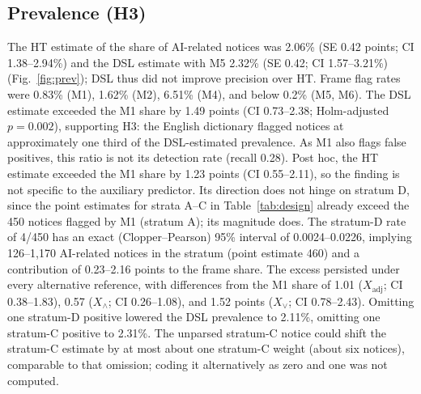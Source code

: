 \documentclass[runningheads]{llncs}
\begin{document}
\subsection{Prevalence (H3)}
The HT estimate of the share of AI-related notices was 2.06\% (SE 0.42 points; CI 1.38--2.94\%) and the DSL estimate with M5 2.32\% (SE 0.42; CI 1.57--3.21\%) (Fig.~\ref{fig:prev}); DSL thus did not improve precision over HT. Frame flag rates were 0.83\% (M1), 1.62\% (M2), 6.51\% (M4), and below 0.2\% (M5, M6). The DSL estimate exceeded the M1 share by 1.49 points (CI 0.73--2.38; Holm-adjusted $p=0.002$), supporting H3: the English dictionary flagged notices at approximately one third of the DSL-estimated prevalence. As M1 also flags false positives, this ratio is not its detection rate (recall 0.28). Post hoc, the HT estimate exceeded the M1 share by 1.23 points (CI 0.55--2.11), so the finding is not specific to the auxiliary predictor. Its direction does not hinge on stratum D, since the point estimates for strata A--C in Table~\ref{tab:design} already exceed the 450 notices flagged by M1 (stratum A); its magnitude does. The stratum-D rate of 4/450 has an exact (Clopper--Pearson) 95\% interval of 0.0024--0.0226, implying 126--1,170 AI-related notices in the stratum (point estimate 460) and a contribution of 0.23--2.16 points to the frame share. The excess persisted under every alternative reference, with differences from the M1 share of 1.01 ($X_{\mathrm{adj}}$; CI 0.38--1.83), 0.57 ($X_\wedge$; CI 0.26--1.08), and 1.52 points ($X_\vee$; CI 0.78--2.43). Omitting one stratum-D positive lowered the DSL prevalence to 2.11\%, omitting one stratum-C positive to 2.31\%. The unparsed stratum-C notice could shift the stratum-C estimate by at most about one stratum-C weight (about six notices), comparable to that omission; coding it alternatively as zero and one was not computed.
\end{document}
